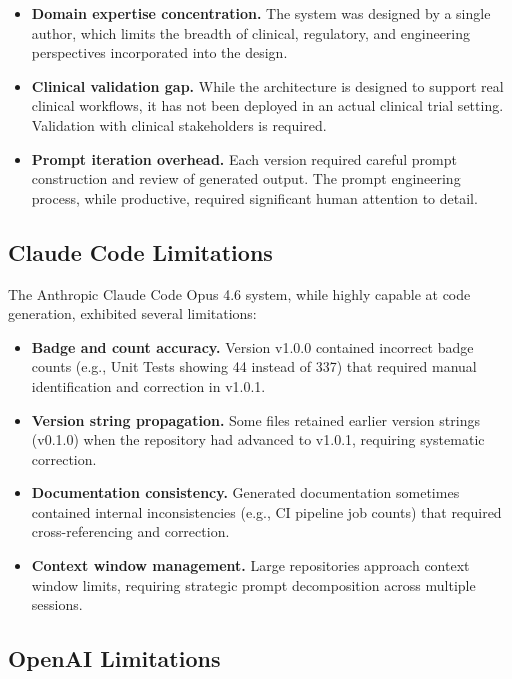 \begin{itemize}[leftmargin=*]
\item \textbf{Domain expertise concentration.} The system was designed by a single author, which limits the breadth of clinical, regulatory, and engineering perspectives incorporated into the design.
\item \textbf{Clinical validation gap.} While the architecture is designed to support real clinical workflows, it has not been deployed in an actual clinical trial setting. Validation with clinical stakeholders is required.
\item \textbf{Prompt iteration overhead.} Each version required careful prompt construction and review of generated output. The prompt engineering process, while productive, required significant human attention to detail.
\end{itemize}

\subsection{Claude Code Limitations}

The Anthropic Claude Code Opus 4.6 system, while highly capable at code generation, exhibited several limitations:

\begin{itemize}[leftmargin=*]
\item \textbf{Badge and count accuracy.} Version v1.0.0 contained incorrect badge counts (e.g., Unit Tests showing 44 instead of 337) that required manual identification and correction in v1.0.1.
\item \textbf{Version string propagation.} Some files retained earlier version strings (v0.1.0) when the repository had advanced to v1.0.1, requiring systematic correction.
\item \textbf{Documentation consistency.} Generated documentation sometimes contained internal inconsistencies (e.g., CI pipeline job counts) that required cross-referencing and correction.
\item \textbf{Context window management.} Large repositories approach context window limits, requiring strategic prompt decomposition across multiple sessions.
\end{itemize}

\subsection{OpenAI Limitations}

